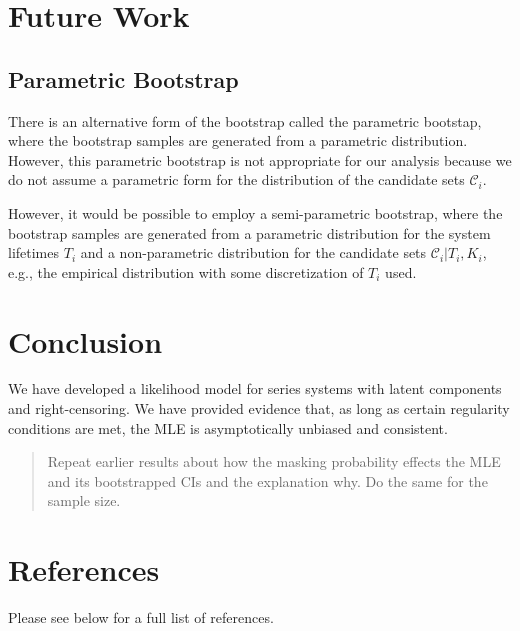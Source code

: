 \documentclass[
]{article}
\newenvironment{cslreferences}%
  {}%
  {\par}
\begin{document}
\hypertarget{future-work}{%
\section{Future Work}\label{future-work}}

\hypertarget{parametric-bootstrap}{%
\subsection{Parametric Bootstrap}\label{parametric-bootstrap}}

There is an alternative form of the bootstrap called the parametric
bootstap, where the bootstrap samples are generated from a parametric
distribution. However, this parametric bootstrap is not appropriate for
our analysis because we do not assume a parametric form for the
distribution of the candidate sets \(\mathcal{C}_i\).

However, it would be possible to employ a semi-parametric bootstrap,
where the bootstrap samples are generated from a parametric distribution
for the system lifetimes \(T_i\) and a non-parametric distribution for
the candidate sets \(\mathcal{C}_i | T_i, K_i\), e.g., the empirical
distribution with some discretization of \(T_i\) used.

\hypertarget{conclusion}{%
\section{Conclusion}\label{conclusion}}

We have developed a likelihood model for series systems with latent
components and right-censoring. We have provided evidence that, as long
as certain regularity conditions are met, the MLE is asymptotically
unbiased and consistent.

\begin{quote}
Repeat earlier results about how the masking probability effects the MLE
and its bootstrapped CIs and the explanation why. Do the same for the
sample size.
\end{quote}

\hypertarget{references}{%
\section*{References}\label{references}}

Please see below for a full list of references.

\hypertarget{refs}{}
\begin{cslreferences}
\end{cslreferences}
\end{document}
